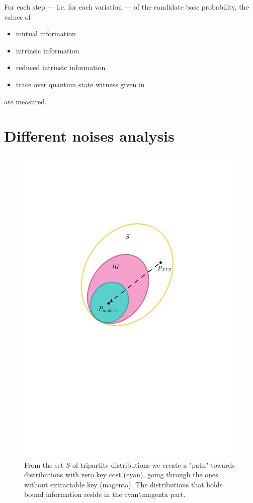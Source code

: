    For each step --- i.e. for each variation --- of the candidate base probability, the values of 
    \begin{itemize}
    	\item	mutual information
    	\item	intrinsic information
    	\item	reduced intrinsic information
    	\item	trace over quantum state witness given in \cite{DPS04}
    \end{itemize}
    are measured.
\section{Different noises analysis}

	\begin{figure}[h!]
		\centering
		\includegraphics[scale=0.5]{images/analysis-path}
		\caption{From the set $S$ of tripartite distributions we create a "path"
towards distributions with zero key cost (cyan), going through the ones without extractable key (magenta). The distributions that holds bound information reside in the cyan$\setminus$magenta part.}
		\label{Fig:analysis-path}
	\end{figure}
